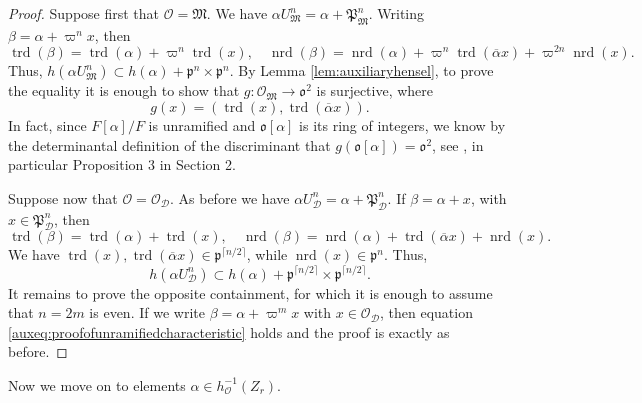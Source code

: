 \documentclass{article}
\theoremstyle{named}
\newcommand{\D}{\mathcal{D}}
\newcommand{\M}{\mathfrak{M}}
\renewcommand{\O}{\mathcal{O}}
\renewcommand{\o}{\mathfrak{o}}
\renewcommand{\P}{\mathfrak{P}}
\newcommand{\p}{\mathfrak{p}}
\DeclareMathOperator{\nrd}{nrd}
\DeclareMathOperator{\trd}{trd}
\begin{document}
\begin{proof}
Suppose first that $\O = \M$. We have $\alpha U_\M^n = \alpha + \P_\M^n$. Writing $\beta = \alpha + \varpi^n x$, then 
\begin{equation}\label{auxeq:proofofunramifiedcharacteristic}
    \trd(\beta) = \trd(\alpha) + \varpi^n \trd(x), \quad \nrd(\beta) = \nrd(\alpha) + \varpi^n \trd(\overline{\alpha}x) + \varpi^{2n}\nrd(x).
\end{equation}
Thus, $h(\alpha U_\M^n) \subset h(\alpha) + \p^n \times \p^n$. By Lemma \ref{lem:auxiliaryhensel}, to prove the equality it is enough to show that $g: \O_\M \rightarrow \o^2$ is surjective, where 
\begin{equation*}
g(x) = (\trd(x), \trd(\overline{\alpha}x)).
\end{equation*}
In fact, since $F[\alpha]/F$ is unramified and $\o[\alpha]$ is its ring of integers, we know by the determinantal definition of the discriminant that $g(\o[\alpha]) = \o^2$, see \cite[Chapter III]{serrelocalfields}, in particular Proposition 3 in Section 2.

Suppose now that $\O = \O_\D$. As before we have $\alpha U_\D^n = \alpha + \P_\D^n$. If $\beta = \alpha + x$, with $x \in \P_\D^n$, then
\begin{equation*}
    \trd(\beta) = \trd(\alpha) +\trd(x), \quad \nrd(\beta) = \nrd(\alpha) + \trd(\overline{\alpha}x) + \nrd(x).
\end{equation*} 
We have $\trd(x), \trd(\overline{\alpha}x) \in \p^{\lceil n/2\rceil}$, while $\nrd(x) \in \p^n$. Thus,
\begin{equation*}
    h(\alpha U_\D^n) \subset h(\alpha) + \p^{\lceil n/2\rceil} \times \p^{\lceil n/2 \rceil}.
\end{equation*}
It remains to prove the opposite containment, for which it is enough to assume that $n = 2m$ is even. If we write $\beta = \alpha + \varpi^m x$ with $x \in \O_\D$, then equation \eqref{auxeq:proofofunramifiedcharacteristic} holds and the proof is exactly as before. 
\end{proof}

Now we move on to elements $\alpha \in h_\O^{-1}(Z_r)$. 
\end{document}
